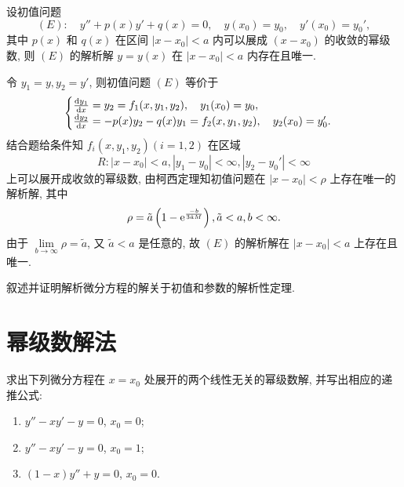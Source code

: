 \begin{exercise}
  设初值问题
  \[(E)\colon\quad y''+p(x)y'+q(x)=0,\quad y(x_0)=y_0,\quad y'(x_0)=y_0',\]
  其中 $p(x)$ 和 $q(x)$ 在区间 $|x-x_0|<a$ 内可以展成 $(x-x_0)$ 的收敛的幂级数, 
  则 $(E)$ 的解析解 $y=y(x)$ 在 $|x-x_0|<a$ 内存在且唯一.
\end{exercise}

\begin{solution} 
  令 $y_1=y,y_2=y'$, 则初值问题 $(E)$ 等价于
  \[\begin{cases}
  \frac{\mathop{}\!\mathrm{d} y_1}{\mathop{}\!\mathrm{d} x} = y_2 = f_1(x,y_1,y_2),\quad y_1(x_0)=y_0,\\
  \frac{\mathop{}\!\mathrm{d} y_2}{\mathop{}\!\mathrm{d} x}=-p(x)y_2-q(x)y_1=f_2(x,y_1,y_2),\quad y_2(x_0)=y_0'.
  \end{cases}\]
  结合题给条件知 $f_i(x,y_1,y_2)(i=1,2)$ 在区域 
  \[R:|x-x_0|<a,|y_1-y_0|<\infty,|y_2-y_0'|<\infty\]
  上可以展开成收敛的幂级数, 由柯西定理知初值问题在 $|x-x_0|<\rho$ 上存在唯一的解析解, 其中
  \[\rho=\tilde{a}\left(1-\mathrm{e}^{\frac{-b}{3\tilde{a}M}}\right),\tilde{a}<a,b<\infty.\]
  由于 $\lim\limits_{b\to\infty}\rho=\tilde{a}$, 
  又 $\tilde{a}<a$ 是任意的, 故 $(E)$ 的解析解在 $|x-x_0|<a$ 上存在且唯一.
\end{solution}



\begin{exercise}
  叙述并证明解析微分方程的解关于初值和参数的解析性定理.
\end{exercise}



\section{幂级数解法}


\begin{exercise}
  求出下列微分方程在 $x=x_0$ 处展开的两个线性无关的幂级数解, 并写出相应的递推公式:
  \begin{enumerate}[(1)]
  \item $y''-xy'-y=0$, $x_0=0$;
  \item $y''-xy'-y=0$, $x_0=1$;
  \item $(1-x)y''+y=0$, $x_0=0$.
  \end{enumerate}
\end{exercise}

